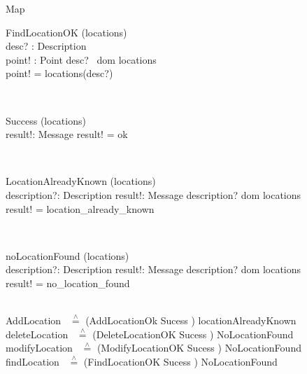 \documentclass[12pt]{article}
\begin{document}
\begin{spacing}{1.5}
\begin{class}{Map}
\begin{op}{FindLocationOK}
\Xi (locations) \\
desc? : Description\\
point! : Point
\ST
desc? \in ~dom locations \\
point! = locations(desc?)
\end{op}\\
\begin{op}{Success}
\Xi (locations) \\
result!: Message
\ST
result! = ok
\end{op}\\
\zbreak
\begin{op}{LocationAlreadyKnown}
\Xi (locations) \\
description?: Description
result!: Message
\ST
description? \in dom locations \\
result! = location_already_known
\end{op}\\
\begin{op}{noLocationFound}
\Xi (locations) \\
description?: Description
result!: Message
\ST
description? \notin dom locations \\
result! = no_location_found
\end{op}\\
AddLocation ~$\stackrel{\wedge}{=}$ (AddLocationOk \land Sucess ) \lor locationAlreadyKnown
\\
deleteLocation ~$\stackrel{\wedge}{=}$ (DeleteLocationOK \land Sucess ) \lor NoLocationFound
\\
modifyLocation ~$\stackrel{\wedge}{=}$ (ModifyLocationOK \land Sucess ) \lor NoLocationFound
\\
findLocation ~$\stackrel{\wedge}{=}$ (FindLocationOK \land Sucess ) \lor NoLocationFound
\end{class}
\znewpage


\end{spacing}
\end{document}
